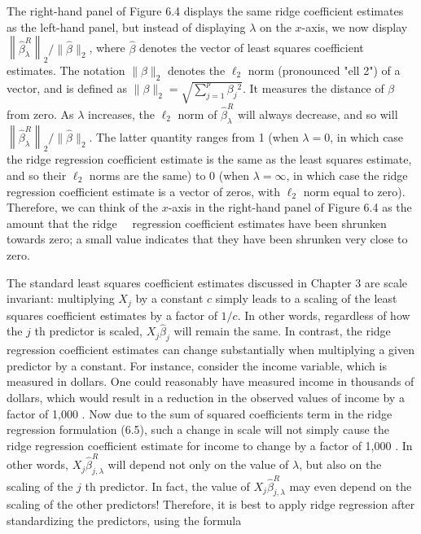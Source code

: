 \documentclass[10pt]{article}
\begin{document}
The right-hand panel of Figure 6.4 displays the same ridge coefficient estimates as the left-hand panel, but instead of displaying $\lambda$ on the $x$-axis, we now display $\left\|\hat{\beta}_{\lambda}^{R}\right\|_{2} /\|\hat{\beta}\|_{2}$, where $\hat{\beta}$ denotes the vector of least squares coefficient estimates. The notation $\|\beta\|_{2}$ denotes the $\ell_{2}$ norm (pronounced "ell 2") of a vector, and is defined as $\|\beta\|_{2}=\sqrt{\sum_{j=1}^{p} \beta_{j}{ }^{2}}$. It measures the distance of $\beta$ from zero. As $\lambda$ increases, the $\ell_{2}$ norm of $\hat{\beta}_{\lambda}^{R}$ will always decrease, and so will $\left\|\hat{\beta}_{\lambda}^{R}\right\|_{2} /\|\hat{\beta}\|_{2}$. The latter quantity ranges from 1 (when $\lambda=0$, in which case the ridge regression coefficient estimate is the same as the least squares estimate, and so their $\ell_{2}$ norms are the same) to 0 (when $\lambda=\infty$, in which case the ridge regression coefficient estimate is a vector of zeros, with $\ell_{2}$ norm equal to zero). Therefore, we can think of the $x$-axis in the right-hand panel of Figure 6.4 as the amount that the ridge\
\
regression coefficient estimates have been shrunken towards zero; a small value indicates that they have been shrunken very close to zero.

The standard least squares coefficient estimates discussed in Chapter 3 are scale invariant: multiplying $X_{j}$ by a constant $c$ simply leads to a scaling of the least squares coefficient estimates by a factor of $1 / c$. In other words, regardless of how the $j$ th predictor is scaled, $X_{j} \hat{\beta}_{j}$ will remain the same. In contrast, the ridge regression coefficient estimates can change substantially when multiplying a given predictor by a constant. For instance, consider the income variable, which is measured in dollars. One could reasonably have measured income in thousands of dollars, which would result in a reduction in the observed values of income by a factor of 1,000 . Now due to the sum of squared coefficients term in the ridge regression formulation (6.5), such a change in scale will not simply cause the ridge regression coefficient estimate for income to change by a factor of 1,000 . In other words, $X_{j} \hat{\beta}_{j, \lambda}^{R}$ will depend not only on the value of $\lambda$, but also on the scaling of the $j$ th predictor. In fact, the value of $X_{j} \hat{\beta}_{j, \lambda}^{R}$ may even depend on the scaling of the other predictors! Therefore, it is best to apply ridge regression after standardizing the predictors, using the formula
\end{document}
